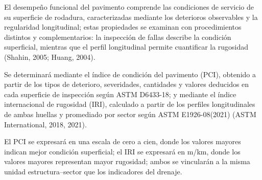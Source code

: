 

El desempeño funcional del pavimento comprende las condiciones de servicio de su superficie de rodadura, caracterizadas mediante los deterioros observables y la regularidad longitudinal; estas propiedades se examinan con procedimientos distintos y complementarios: la inspección de fallas describe la condición superficial, mientras que el perfil longitudinal permite cuantificar la rugosidad (Shahin, 2005; Huang, 2004).


Se determinará mediante el índice de condición del pavimento (PCI), obtenido a partir de los tipos de deterioro, severidades, cantidades y valores deducidos en cada superficie de inspección según ASTM D6433-18; y mediante el índice internacional de rugosidad (IRI), calculado a partir de los perfiles longitudinales de ambas huellas y promediado por sector según ASTM E1926-08(2021) (ASTM International, 2018, 2021).

El PCI se expresará en una escala de cero a cien, donde los valores mayores indican mejor condición superficial; el IRI se expresará en m/km, donde los valores mayores representan mayor rugosidad; ambos se vincularán a la misma unidad estructura–sector que los indicadores del drenaje.

